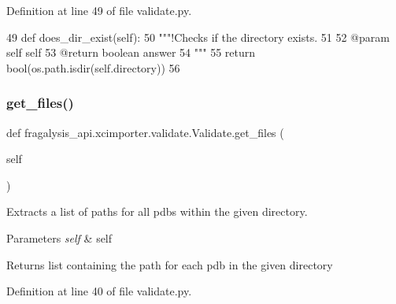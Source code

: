 Definition at line 49 of file validate.\+py.


\begin{DoxyCode}
49     \textcolor{keyword}{def }does\_dir\_exist(self):
50         \textcolor{stringliteral}{"""!Checks if the directory exists.}
51 \textcolor{stringliteral}{        }
52 \textcolor{stringliteral}{        @param self self}
53 \textcolor{stringliteral}{        @return boolean answer}
54 \textcolor{stringliteral}{        """}
55         \textcolor{keywordflow}{return} bool(os.path.isdir(self.directory))
56 
\end{DoxyCode}
\mbox{\label{classfragalysis__api_1_1xcimporter_1_1validate_1_1_validate_a0b6c43c8e26bc7b2bc5f2caf982f0a5e}} 
\subsubsection{\texorpdfstring{get\+\_\+files()}{get\_files()}}
{\footnotesize\ttfamily def fragalysis\+\_\+api.\+xcimporter.\+validate.\+Validate.\+get\+\_\+files (\begin{DoxyParamCaption}\item[{}]{self }\end{DoxyParamCaption})}



Extracts a list of paths for all pdbs within the given directory. 


\begin{DoxyParams}{Parameters}
{\em self} & self \\
\hline
\end{DoxyParams}
\begin{DoxyReturn}{Returns}
list containing the path for each pdb in the given directory 
\end{DoxyReturn}


Definition at line 40 of file validate.\+py.



